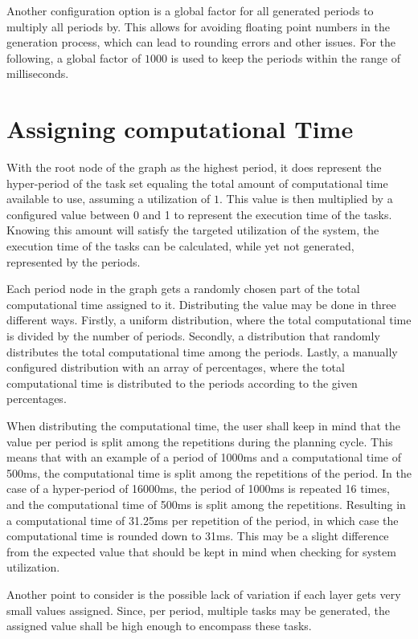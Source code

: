 Another configuration option is a global factor for all generated periods to multiply all periods by.
This allows for avoiding floating point numbers in the generation process, which can lead to rounding errors and other issues.
For the following, a global factor of $1000$ is used to keep the periods within the range of milliseconds.

\section{Assigning computational Time}\label{subsec:impl:assigning-computational-time}
With the root node of the graph as the highest period, it does represent the hyper-period of the task set equaling the total amount of computational time available to use, assuming a utilization of $1$.
This value is then multiplied by a configured value between 0 and 1 to represent the execution time of the tasks.
Knowing this amount will satisfy the targeted utilization of the system, the execution time of the tasks can be calculated, while yet not generated, represented by the periods.

Each period node in the graph gets a randomly chosen part of the total computational time assigned to it.
Distributing the value may be done in three different ways.
Firstly, a uniform distribution, where the total computational time is divided by the number of periods.
Secondly, a distribution that randomly distributes the total computational time among the periods.
Lastly, a manually configured distribution with an array of percentages, where the total computational time is distributed to the periods according to the given percentages.

When distributing the computational time, the user shall keep in mind that the value per period is split among the repetitions during the planning cycle.
This means that with an example of a period of 1000ms and a computational time of 500ms, the computational time is split among the repetitions of the period.
In the case of a hyper-period of 16000ms, the period of 1000ms is repeated 16 times, and the computational time of 500ms is split among the repetitions.
Resulting in a computational time of 31.25ms per repetition of the period, in which case the computational time is rounded down to 31ms.
This may be a slight difference from the expected value that should be kept in mind when checking for system utilization.

Another point to consider is the possible lack of variation if each layer gets very small values assigned.
Since, per period, multiple tasks may be generated, the assigned value shall be high enough to encompass these tasks.

